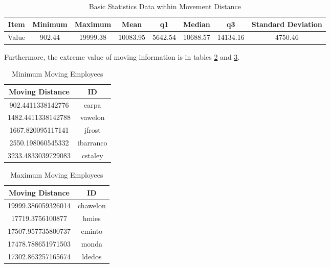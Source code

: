 \documentclass[aps, 10pt, a4paper]{article}
\begin{document}
                \begin{table}[htbp]
                    \centering
                    \caption{Basic Statistics Data within Movement Distance}
                    \label{tb:movementdist}
                    \begin{tabular}{c||c|c|c|c|c|c|c}
                        Item & Minimum & Maximum & Mean & q1 & Median & q3 & Standard Deviation \\ \hline
                        Value & 902.44 & 19999.38 & 10083.95 & 5642.54 & 10688.57 & 14134.16 & 4750.46 \\
                    \end{tabular}
                \end{table}
            
                Furthermore, the extreme value of moving information is in tables \ref{tb:movemin} and \ref{tb:movemax}.
                
                \begin{table}[htbp]
                    \centering
                    \caption{Minimum Moving Employees}
                    \label{tb:movemin}
                    \begin{tabular}{c|c}
                        Moving Distance & ID \\ \hline
                        902.4411338142776 & earpa \\
                        1482.4411338142788 & vawelon \\
                        1667.820095117141 & jfrost \\
                        2550.198060545332 & ibarranco \\
                        3233.4833039729083 & cstaley \\
                    \end{tabular}
                \end{table}
            
                \begin{table}[htbp]
                    \centering
                    \caption{Maximum Moving Employees}
                    \label{tb:movemax}
                    \begin{tabular}{c|c}
                        Moving Distance & ID \\ \hline
                        19999.386059326014 & chawelon \\
                        17719.3756100877 & hmies \\
                        17507.957735800737 & eminto \\
                        17478.788651971503 & monda \\
                        17302.863257165674 & ldedos \\
                    \end{tabular}
                \end{table}
            
\end{document}
